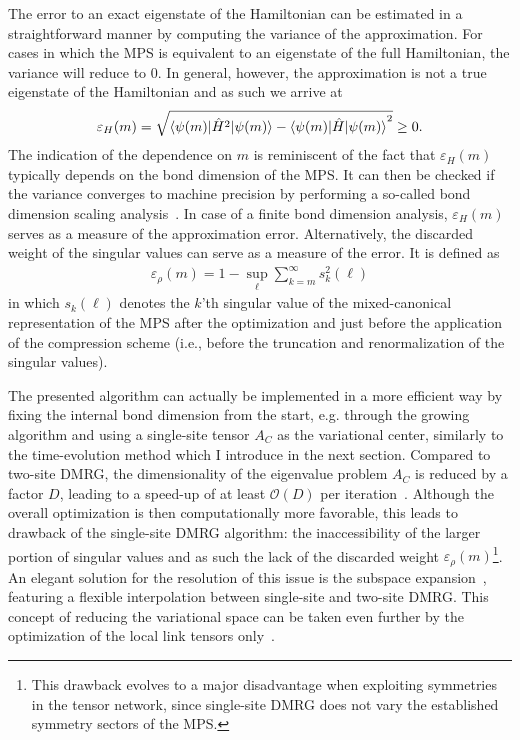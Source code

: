 The error to an exact eigenstate of the Hamiltonian can be estimated in a straightforward manner by computing the variance of the approximation.
For cases in which the MPS is equivalent to an eigenstate of the full Hamiltonian, the variance will reduce to $0$. In general, however, the approximation is not a true eigenstate of the Hamiltonian and as such we arrive at
\begin{align}
    \varepsilon_H(m) = \sqrt{\braket{\psi(m)|\hat H^2|\psi(m)} - \braket{\psi(m)|\hat H|\psi(m)}^2}\geq 0.
\end{align}
The indication of the dependence on $m$ is reminiscent of the fact that $\varepsilon_H(m)$ typically depends on the bond dimension of the MPS.
It can then be checked if the variance converges to machine precision by performing a so-called bond dimension scaling analysis~\cite{Hubig2018}.
In case of a finite bond dimension analysis, $\varepsilon_H(m)$ serves as a measure of the approximation error.
Alternatively, the discarded weight of the singular values can serve as a measure of the error.
It is defined as
\begin{align}
    \varepsilon_\rho(m) = 1 - \sup_{\ell}\sum_{k=m}^\infty s_k^2(\ell)
\end{align}
in which $s_k(\ell)$ denotes the $k$'th singular value of the mixed-canonical representation of the MPS after the optimization and just before the application of the compression scheme (i.e., before the truncation and renormalization of the singular values).

The presented algorithm can actually be implemented in a more efficient way by fixing the internal bond dimension from the start, e.g. through the growing algorithm and using a single-site tensor $A_C$ as the variational center, similarly to the time-evolution method which I introduce in the next section.
Compared to two-site DMRG, the dimensionality of the eigenvalue problem $A_C$ is reduced by a factor $D$, leading to a speed-up of at least $\mathcal O(D)$ per iteration~\cite{White2005}.
Although the overall optimization is then computationally more favorable, this leads to drawback of the single-site DMRG algorithm: the inaccessibility of the larger portion of singular values and as such the lack of the discarded weight $\varepsilon_\rho(m)$\footnote{This drawback evolves to a major disadvantage when exploiting symmetries in the tensor network, since single-site DMRG does not vary the established symmetry sectors of the MPS.}.
An elegant solution for the resolution of this issue is the subspace expansion~\cite{Hubig2015}, featuring a flexible interpolation between single-site and two-site DMRG.
This concept of reducing the variational space can be taken even further by the optimization of the local link tensors only~\cite{Fernandez2020}.
%
%
